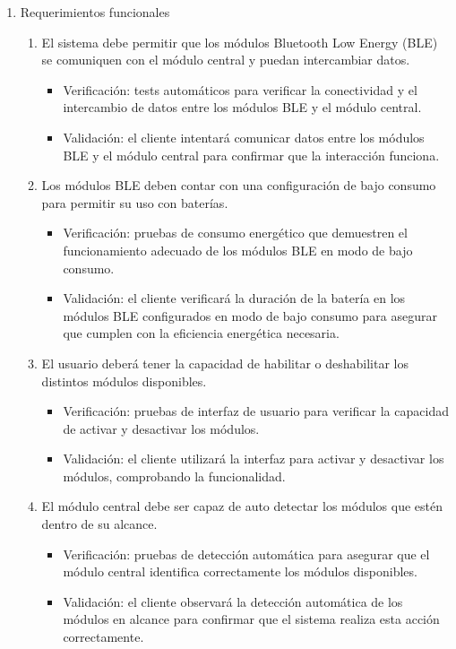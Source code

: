 \documentclass[
11pt, %
]{charter}
\begin{document}
\begin{enumerate}
	\item Requerimientos funcionales
		\begin{enumerate}
			\item El sistema debe permitir que los módulos Bluetooth Low Energy (BLE) se comuniquen con el módulo central y puedan intercambiar datos.
			\begin{itemize}
				\item Verificación: tests automáticos para verificar la conectividad y el intercambio de datos entre los módulos BLE y el módulo central.
				\item Validación: el cliente intentará comunicar datos entre los módulos BLE y el módulo central para confirmar que la interacción funciona.
			\end{itemize}
			\item Los módulos BLE deben contar con una configuración de bajo consumo para permitir su uso con baterías.
			\begin{itemize}
				\item Verificación:  pruebas de consumo energético que demuestren el funcionamiento adecuado de los módulos BLE en modo de bajo consumo.
				\item Validación: el cliente verificará la duración de la batería en los módulos BLE configurados en modo de bajo consumo para asegurar que cumplen con la eficiencia energética necesaria.
			\end{itemize}
			\item El usuario deberá tener la capacidad de habilitar o deshabilitar los distintos módulos disponibles.
			\begin{itemize}
				\item Verificación: pruebas de interfaz de usuario para verificar la capacidad de activar y desactivar los módulos.
				\item Validación: el cliente utilizará la interfaz para activar y desactivar los módulos, comprobando la funcionalidad.
			\end{itemize}
			\item El módulo central debe ser capaz de auto detectar los módulos que estén dentro de su alcance.
			\begin{itemize}
				\item Verificación: pruebas de detección automática para asegurar que el módulo central identifica correctamente los módulos disponibles.
				\item Validación: el cliente observará la detección automática de los módulos en alcance para confirmar que el sistema realiza esta acción correctamente.

\end{itemize}
\end{enumerate}
\end{enumerate}
\end{document}

